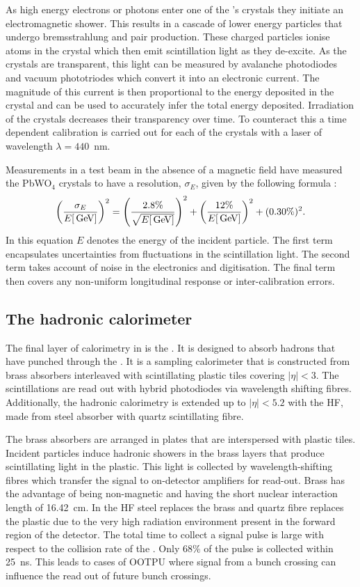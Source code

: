As high energy electrons or photons enter one of the \ECAL's crystals
they initiate an electromagnetic shower. This results in a cascade of
lower energy particles that undergo bremsstrahlung and pair
production.  These charged particles ionise atoms in the crystal which
then emit scintillation light as they de-excite. As the crystals are
transparent, this light can be measured by avalanche photodiodes and
vacuum phototriodes which convert it into an electronic current. The
magnitude of this current is then proportional to the energy deposited
in the crystal and can be used to accurately infer the total energy
deposited. Irradiation of the crystals decreases their transparency
over time. To counteract this a time dependent calibration is carried
out for each of the crystals with a laser of wavelength
$\lambda=440$~nm. 

Measurements in a test beam in the absence of a magnetic field have
measured the PbWO$_4$ crystals to have a resolution, $\sigma_E$, given
by the following formula \cite{1748-0221-2-04-P04004}:
\begin{equation} \label{eq:ecalres}
\left(\frac{\sigma_E}{E[\mathrm{\,Ge\kern -0.1em V}]}\right)^2=\left(\frac{2.8\%}
{\sqrt{E[\mathrm{\,Ge\kern -0.1em V}]}}\right)^2+\left(\frac{12\%}{E[\mathrm{\,Ge\kern -0.1em V}]}\right)^2+(0.30\%)^2.
\end{equation} 
In this equation $E$ denotes the energy of the incident
particle. The first term encapsulates uncertainties from fluctuations in the
scintillation light. The second term takes account of noise in the
electronics and digitisation. The final term then covers any
non-uniform longitudinal response or inter-calibration errors. 

\subsection{The hadronic calorimeter} 

The final layer of calorimetry in \CMS is the \HCAL \cite{CMS:HCAL}.
It is designed to absorb hadrons that have punched through the \ECAL.
It is a sampling calorimeter that is constructed from brass absorbers
interleaved with scintillating plastic tiles covering $|\eta|<3$. The
scintillations are read out with hybrid photodiodes via wavelength
shifting fibres.  Additionally, the hadronic calorimetry is extended
up to $|\eta|<5.2$ with the \ac{HF}, made from steel absorber with
quartz scintillating fibre. 

The brass absorbers are arranged in plates that are interspersed with
plastic tiles. Incident particles induce hadronic showers in the
brass layers that produce scintillating light in the plastic. This
light is collected by wavelength-shifting fibres which transfer the
signal to on-detector amplifiers for read-out. Brass has the advantage
of being non-magnetic and having the short nuclear interaction length
of 16.42~cm. In the \ac{HF} steel replaces the brass and quartz fibre
replaces the plastic due to the very high radiation environment
present in the forward region of the detector. The total time to
collect a \HCAL signal pulse is large with respect to the collision
rate of the \LHC. Only $68\%$ of the pulse is collected within 25~ns.
This leads to cases of \ac{OOTPU} where signal from a bunch
crossing can influence the read out of future bunch crossings.

